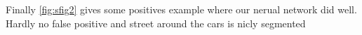 Finally \ref{fig:sfig2} gives some positives example where our nerual network did well. Hardly no false positive and street around the cars is nicly segmented
















%
